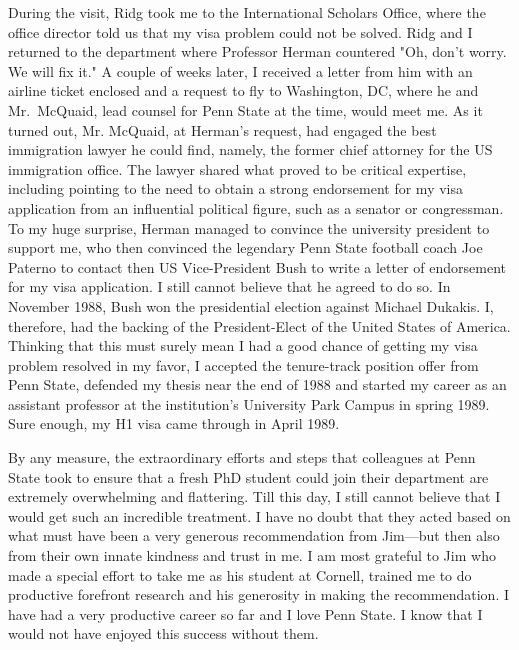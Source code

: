\documentclass[CJK,11pt]{amsart}
\theoremstyle{definition}
\begin{document}
\begin{CJK*}{UTF8}{gbsn}
During the visit, Ridg took me to the International Scholars Office, where the office director  told us that my visa problem could not be solved. Ridg and I returned to the department where Professor Herman countered "Oh, don't worry. We will fix it." A couple of weeks later, I received a letter from him with an airline ticket enclosed and a request to fly to Washington, DC, where he and Mr.~McQuaid, lead counsel for Penn State at the time, would meet me. As it turned out, Mr. McQuaid, at Herman's request, had engaged the best immigration lawyer he could find, namely, the former chief attorney for the US immigration office. The lawyer shared what proved to be critical expertise, including pointing to the need to obtain a strong endorsement for my visa application from an influential political figure, such as a senator or congressman. To my huge surprise, Herman managed to convince the university president to support me, who then convinced the legendary Penn State football coach Joe Paterno to contact then US Vice-President Bush to write a letter of endorsement for my visa application. I still cannot believe that he agreed to do so. In November 1988, Bush won the presidential election against Michael Dukakis. I, therefore, had the backing of the President-Elect of the United States of America. Thinking that this must surely mean I had a good chance of getting my visa problem resolved in my favor, I accepted the tenure-track position offer from Penn State, defended my thesis near the end of 1988 and started my career as an assistant professor at the institution's University Park Campus in spring 1989. Sure enough, my H1 visa came through in April 1989.

By any measure, the extraordinary efforts and steps that colleagues at Penn State took to ensure that a fresh PhD student could join their department are extremely overwhelming and flattering.  Till this day, I still cannot believe that I would get such an incredible treatment. I have no doubt that they acted based on what must have been a very generous recommendation from Jim—but then also from their own innate kindness and trust in me.   I am most grateful to Jim who made a special effort to take me as his student at Cornell,  trained me to do productive forefront research and his generosity in making the recommendation. 
I have had a very productive career so far and I love Penn State. I know that I would not have enjoyed this success without them.


\end{CJK*}
\end{document}
